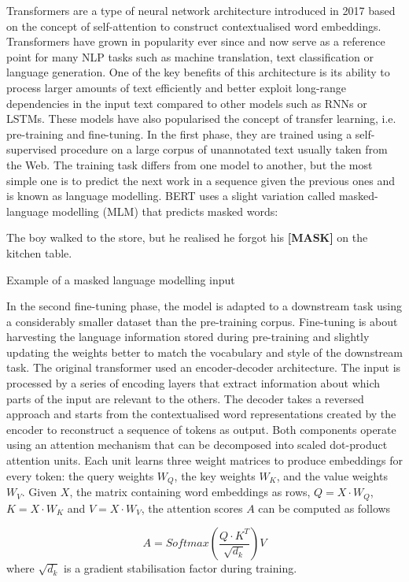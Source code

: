 Transformers are a type of neural network architecture introduced in 2017\cite{transformers} based on the concept of self-attention to construct contextualised word embeddings. 
Transformers have grown in popularity ever since and now serve as a reference point for many NLP tasks such as machine translation, text classification or language generation. One of the key benefits of this architecture is its ability to process larger amounts of text efficiently and better exploit long-range dependencies in the input text compared to other models such as RNNs or LSTMs. 
These models have also popularised the concept of transfer learning, i.e. pre-training and fine-tuning. In the first phase, they are trained using a self-supervised procedure on a large corpus of unannotated text usually taken from the Web. The training task differs from one model to another, but the most simple one is to predict the next work in a sequence given the previous ones and is known as language modelling. BERT\cite{BERT} uses a slight variation called masked-language modelling (MLM) that predicts masked words:

\epigraph{
The boy walked to the store, but he realised he forgot his \textbf{[MASK]} on the kitchen table.
}{Example of a masked language modelling input}
\newpage
In the second fine-tuning phase, the model is adapted to a downstream task using a considerably smaller dataset than the pre-training corpus. Fine-tuning is about harvesting the language information stored during pre-training and slightly updating the weights better to match the vocabulary and style of the downstream task.   
The original transformer used an encoder-decoder architecture. The input is processed by a series of encoding layers that extract information about which parts of the input are relevant to the others. The decoder takes a reversed approach and starts from the contextualised word representations created by the encoder to reconstruct a sequence of tokens as output. Both components operate using an attention mechanism that can be decomposed into scaled dot-product attention units. Each unit learns three weight matrices to  produce embeddings for every token:  the query weights $W_{Q}$, the key weights $W_{K}$, and the value weights  $W_{V}$. Given $X$, the matrix containing word embeddings as rows, $Q = X \cdot W_Q$, $K = X \cdot W_K$ and $V = X \cdot W_V$, the attention scores $A$ can be computed as follows

$$
A = Softmax \left(\frac{Q \cdot K^T}{\sqrt{d_k}} \right) V
$$
where $\sqrt{d_k}$ is a gradient stabilisation factor during training. 

